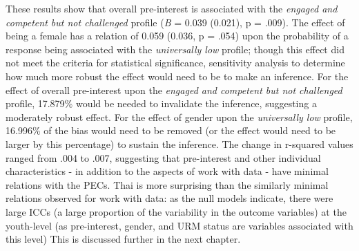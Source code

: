 \documentclass[]{msu-thesis}
\theoremstyle{definition}
\theoremstyle{definition}
\theoremstyle{definition}
\theoremstyle{remark}
\begin{document}
These results show that overall pre-interest is associated with the
\emph{engaged and competent but not challenged} profile (\emph{B} =
0.039 (0.021), p = .009). The effect of being a female has a relation of
0.059 (0.036, p = .054) upon the probability of a response being
associated with the \emph{universally low} profile; though this effect
did not meet the criteria for statistical significance, sensitivity
analysis to determine how much more robust the effect would need to be
to make an inference. For the effect of overall pre-interest upon the
\emph{engaged and competent but not challenged} profile, 17.879\% would
be needed to invalidate the inference, suggesting a moderately robust
effect. For the effect of gender upon the \emph{universally low}
profile, 16.996\% of the bias would need to be removed (or the effect
would need to be larger by this percentage) to sustain the inference.
The change in r-squared values ranged from .004 to .007, suggesting that
pre-interest and other individual characteristics - in addition to the
aspects of work with data - have minimal relations with the PECs. Thai
is more surprising than the similarly minimal relations observed for
work with data: as the null models indicate, there were large ICCs (a
large proportion of the variability in the outcome variables) at the
youth-level (as pre-interest, gender, and URM status are variables
associated with this level) This is discussed further in the next
chapter.
\end{document}
